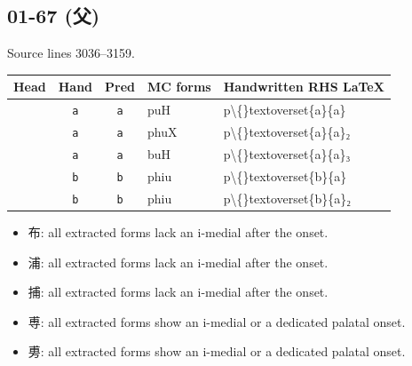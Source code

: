 \documentclass[11pt]{article}
\newcommand{\han}[1]{{\hanfont #1}}
\begin{document}
\subsection*{01-67 (\han{父})}
Source lines 3036--3159.
{\small
\begin{tabularx}{\textwidth}{@{}>{\raggedright\arraybackslash}p{1.4cm}cc>{\raggedright\arraybackslash}X>{\raggedright\arraybackslash}X@{}}
\toprule
Head & Hand & Pred & MC forms & Handwritten RHS LaTeX \\
\midrule
\han{布} & \texttt{a} & \texttt{a} & puH & p\textbackslash\{\}textoverset\{a\}\{a\} \\
\han{浦} & \texttt{a} & \texttt{a} & phuX & p\textbackslash\{\}textoverset\{a\}\{a\}₂ \\
\han{捕} & \texttt{a} & \texttt{a} & buH & p\textbackslash\{\}textoverset\{a\}\{a\}₃ \\
\han{尃} & \texttt{b} & \texttt{b} & phiu & p\textbackslash\{\}textoverset\{b\}\{a\} \\
\han{旉} & \texttt{b} & \texttt{b} & phiu & p\textbackslash\{\}textoverset\{b\}\{a\}₂ \\
\bottomrule
\end{tabularx}
}
\begin{itemize}[nosep]
\item \han{布}: all extracted forms lack an i-medial after the onset.
\item \han{浦}: all extracted forms lack an i-medial after the onset.
\item \han{捕}: all extracted forms lack an i-medial after the onset.
\item \han{尃}: all extracted forms show an i-medial or a dedicated palatal onset.
\item \han{旉}: all extracted forms show an i-medial or a dedicated palatal onset.
\end{itemize}
\end{document}
